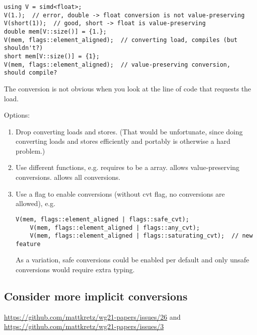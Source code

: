 \begin{lstlisting}[style=Vc]
using V = simd<float>;
V(1.);  // error, double -> float conversion is not value-preserving
V(short(1));  // good, short -> float is value-preserving
double mem[V::size()] = {1.};
V(mem, flags::element_aligned);  // converting load, compiles (but shouldn't?)
short mem[V::size()] = {1};
V(mem, flags::element_aligned);  // value-preserving conversion, should compile?
\end{lstlisting}

The conversion is not obvious when you look at the line of code that requests the load.

Options:
\begin{enumerate}
  \item Drop converting loads and stores.
    (That would be unfortunate, since doing converting loads and stores efficiently and portably is otherwise a hard problem.)

  \item Use different functions, e.g.  requires  to be a  array.  allows value-preserving conversions.
     allows all conversions.

  \item Use a flag to enable conversions (without cvt flag, no conversions are allowed), e.g.
    \begin{lstlisting}[style=Vc]
    V(mem, flags::element_aligned | flags::safe_cvt);
    V(mem, flags::element_aligned | flags::any_cvt);
    V(mem, flags::element_aligned | flags::saturating_cvt);  // new feature
    \end{lstlisting}
    As a variation, safe conversions could be enabled per default and only unsafe conversions would require extra typing.

\end{enumerate}

\subsection{Consider more implicit conversions}
\url{https://github.com/mattkretz/wg21-papers/issues/26} and \url{https://github.com/mattkretz/wg21-papers/issues/3}

